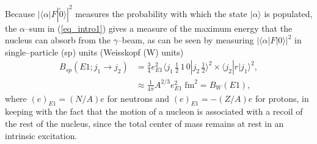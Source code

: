 Because $|\langle \alpha|F|\tilde 0\rangle|^2$ measures the probability with which the state $|\alpha\rangle$ is populated, the $\alpha$--sum in (\ref{eq_intro1}) gives a measure of the maximum energy that the nucleus can absorb from the $\gamma$--beam, as can be seen by measuring $|\langle \alpha|F|0\rangle|^2$ in single--particle (sp) units (Weisskopf (W) units)
\begin{align}\label{eq1.2.5}
\nonumber B_{sp}(E1;j_1\rightarrow j_2)&=\frac{3}{4}e^2_{E1}\langle j_1\, \tfrac{1}{2}\,1\,0|j_2\,\tfrac{1}{2}\rangle^2\times \langle j_2|r|j_1\rangle^2,\\
&\approx \frac{1}{4\pi}A^{2/3}e^2_{E1}\;\text{fm}^2=B_W(E1),
\end{align}
where $(e)_{E1}=(N/A)e$ for neutrons and  $(e)_{E1}=-(Z/A)e$ for protons, in keeping with the fact that the motion of a nucleon is associated with a recoil of the rest of the nucleus, since the total center of mass remains at rest in an intrinsic excitation. 


